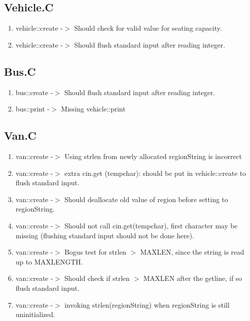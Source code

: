 \subsection{Vehicle.C}
\begin {enumerate}
\item vehicle::create -$>$ Should check for valid value for seating
capacity.
\item vehicle::create -$>$ Should flush standard input after reading
integer. 
\end{enumerate}

\subsection{Bus.C}
\begin {enumerate}
\item bus::create -$>$ Should flush standard input after reading integer.
\item bus::print -$>$ Missing vehicle::print
\end{enumerate}

\subsection{Van.C}
\begin {enumerate}
\item van::create -$>$ Using strlen from newly allocated regionString is
incorrect
\item van::create -$>$ extra cin.get (tempchar): should be put in
vehicle::create to flush standard input.
\item van::create -$>$ Should deallocate old value of region before setting to
regionString.
\item van::create -$>$ Should not call cin.get(tempchar), first
character may be missing (flushing standard input should not be done
here). 
\item van::create -$>$ Bogus test for strlen $>$ MAXLEN, since the
string is read up to MAXLENGTH.
\item van::create -$>$ Should check if strlen $>$ MAXLEN after the
getline, if so flush standard input.
\item van::create -$>$ invoking strlen(regionString) when regionString
is still uninitialized.

\end{enumerate}


